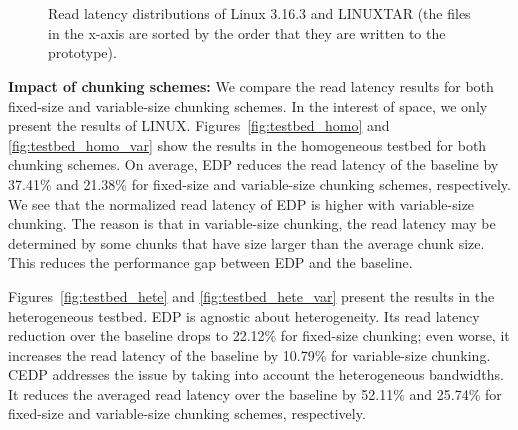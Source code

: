 \begin{figure}[H]
\centering
{}
\\
\\
\caption{Read latency distributions of Linux 3.16.3 and LINUXTAR (the files in
the x-axis are sorted by the order that they are written to the prototype).}
\label{fig:latency}
\end{figure}

{\bf Impact of chunking schemes:}  We compare the read latency results for
both fixed-size and variable-size chunking schemes.  In the interest of space,
we only present the results of LINUX.
Figures~\ref{fig:testbed_homo} and \ref{fig:testbed_homo_var} show the results
in the homogeneous testbed for both chunking schemes.   On average, EDP
reduces the read latency of the baseline by 37.41\% and 21.38\% for fixed-size
and variable-size chunking schemes, respectively.  We see that the normalized
read latency of EDP is higher with variable-size chunking. The reason is that 
in variable-size chunking, the read latency may be determined by some chunks
that have size larger than the average chunk size.  This reduces the
performance gap between EDP and the baseline. 


Figures~\ref{fig:testbed_hete} and \ref{fig:testbed_hete_var} present the
results in the heterogeneous testbed.  EDP is agnostic about heterogeneity. 
Its read latency reduction over the baseline drops to 22.12\% for fixed-size
chunking; even worse, it increases the read latency of the baseline by 10.79\%
for variable-size chunking.  CEDP addresses the issue by taking into account
the heterogeneous bandwidths.  It reduces the averaged read latency over the
baseline by 52.11\% and 25.74\% for fixed-size and variable-size chunking
schemes, respectively. 


